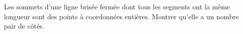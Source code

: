 Les sommets d'une ligne brisée fermée dont tous les segments ont la même longueur sont des points à coordonnées entières. Montrer qu'elle a un nombre pair de côtés.
